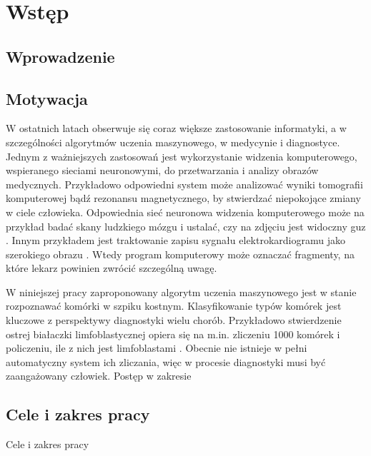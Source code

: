 \chapter{Wstęp}

\section{Wprowadzenie}


\section{Motywacja}

W ostatnich latach obserwuje się coraz większe zastosowanie informatyki, a w szczególności algorytmów uczenia maszynowego,
w medycynie i diagnostyce.
Jednym z ważniejszych zastosowań jest wykorzystanie widzenia komputerowego, wspieranego sieciami neuronowymi, do przetwarzania i analizy obrazów medycznych.
Przykładowo odpowiedni system może analizować wyniki tomografii komputerowej bądź rezonansu magnetycznego, by stwierdzać niepokojące zmiany w ciele człowieka.
Odpowiednia sieć neuronowa widzenia komputerowego może na przykład badać skany ludzkiego mózgu i ustalać, czy na zdjęciu jest widoczny guz \cite{brain_tumor}.
Innym przykładem jest traktowanie zapisu sygnału elektrokardiogramu jako szerokiego
obrazu \cite{ecg_cnn}.
Wtedy program komputerowy może oznaczać fragmenty, na które lekarz powinien zwrócić szczególną uwagę.

W niniejszej pracy zaproponowany algorytm uczenia maszynowego jest w stanie rozpoznawać komórki w szpiku kostnym.
Klasyfikowanie typów komórek jest kluczowe z perspektywy diagnostyki wielu chorób.
Przykładowo stwierdzenie ostrej białaczki limfoblastycznej opiera się na m.in.
zliczeniu 1000 komórek i policzeniu, ile z nich jest limfoblastami \cite{blast_counting_diagnosis}.
Obecnie nie istnieje w pełni automatyczny system ich zliczania, więc w procesie diagnostyki musi być zaangażowany człowiek.
Postęp w zakresie

\section{Cele i zakres pracy}

Cele i zakres pracy
